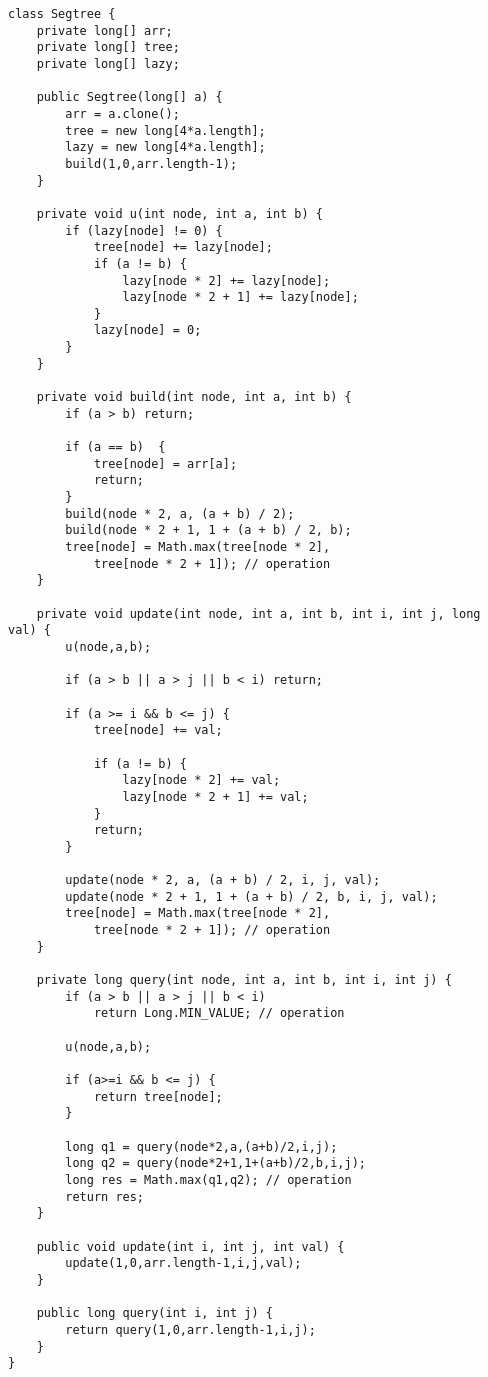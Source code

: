 \begin{verbatim}
class Segtree {
	private long[] arr;
	private long[] tree;
	private long[] lazy;

	public Segtree(long[] a) {
		arr = a.clone();
		tree = new long[4*a.length];
		lazy = new long[4*a.length];
		build(1,0,arr.length-1);
	}
	
	private void u(int node, int a, int b) {
		if (lazy[node] != 0) {
			tree[node] += lazy[node];
			if (a != b) {
				lazy[node * 2] += lazy[node];
				lazy[node * 2 + 1] += lazy[node];
			}
			lazy[node] = 0;
		}
	}
	
	private void build(int node, int a, int b) {
		if (a > b) return;

		if (a == b)  {
			tree[node] = arr[a];
			return;
		}
		build(node * 2, a, (a + b) / 2);
		build(node * 2 + 1, 1 + (a + b) / 2, b);
		tree[node] = Math.max(tree[node * 2],
			tree[node * 2 + 1]); // operation
	}

	private void update(int node, int a, int b, int i, int j, long val) {
		u(node,a,b);

		if (a > b || a > j || b < i) return;

		if (a >= i && b <= j) {
			tree[node] += val;

			if (a != b) {
				lazy[node * 2] += val;
				lazy[node * 2 + 1] += val;
			}
			return;
		}

		update(node * 2, a, (a + b) / 2, i, j, val);
		update(node * 2 + 1, 1 + (a + b) / 2, b, i, j, val);
		tree[node] = Math.max(tree[node * 2], 
			tree[node * 2 + 1]); // operation
	}

	private long query(int node, int a, int b, int i, int j) {
		if (a > b || a > j || b < i)
			return Long.MIN_VALUE; // operation

		u(node,a,b);

		if (a>=i && b <= j) {
			return tree[node];
		}
		
		long q1 = query(node*2,a,(a+b)/2,i,j);
		long q2 = query(node*2+1,1+(a+b)/2,b,i,j);
		long res = Math.max(q1,q2); // operation
		return res;
	}
	
	public void update(int i, int j, int val) {
		update(1,0,arr.length-1,i,j,val);
	}
	
	public long query(int i, int j) {
		return query(1,0,arr.length-1,i,j);
	}
}
\end{verbatim}